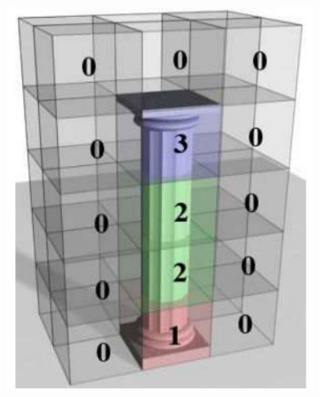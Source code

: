 \documentclass[b5paper,twoside,11pt]{article}
\begin{document}
\begin{figure}
	\centering
	\begin{subfigure}[b]{0.3\textwidth}
		\includegraphics[width=\textwidth]{1a}
		\caption{}
		\label{fig:1a}
	\end{subfigure}
	~ %
	\begin{subfigure}[b]{0.3\textwidth}

\end{subfigure}
\end{figure}
\end{document}
